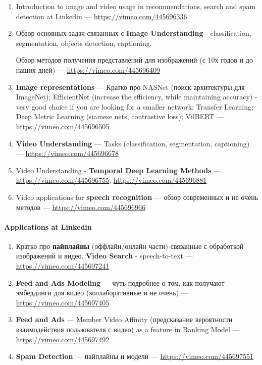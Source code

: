 \begin{enumerate}
    \item Introduction to image and video usage in recommendations, search and spam detection at Linkedin --- \url{https://vimeo.com/445696336}
    \item Обзор основных задач связанных с \textbf{Image Understanding} - classification, segmentation, objects detection, captioning.
    
        Обзор методов получения представлений для изображений (с 10х годов и до наших дней) --- \url{https://vimeo.com/445696409}
    \item \textbf{Image representations} --- Кратко про NASNet (поиск архитектуры для ImageNet); EfficientNet (increase the efficiency, while maintaining accuracy) - very good choice if you are looking for a smaller network; Transfer Learning; Deep Metric Learning (siamese nets, contrastive loss); VilBERT --- \url{https://vimeo.com/445696505}
    \item \textbf{Video Understanding} --- Tasks (classification, segmentation, captioning)  --- \url{https://vimeo.com/445696678}
    \item Video Understanding - \textbf{Temporal Deep Learning Methods} --- \url{https://vimeo.com/445696755}, \url{https://vimeo.com/445696881}
    \item Video applications for \textbf{speech recognition} --- обзор современных и не очень методов --- \url{https://vimeo.com/445696966}
\end{enumerate}

\paragraph{Applications at Linkedin}

\begin{enumerate}
    \item Кратко про \textbf{пайплайны} (оффлайн/онлайн части) связанные с обработкой изображений и видео. \textbf{Video Search} - speech-to-text --- \url{https://vimeo.com/445697241}
    \item \textbf{Feed and Ads Modeling} --- чуть подробнее о том, как получают эмбеддинги для видео (коллаборативные и не очень) --- \url{https://vimeo.com/445697405}
    \item \textbf{Feed and Ads} --- Member Video Affinity (предсказание вероятности взаимодействия пользователя с видео) as a feature in Ranking Model --- \url{https://vimeo.com/445697492}
    \item \textbf{Spam Detection} --- пайплайны и модели --- \url{https://vimeo.com/445697551}
\end{enumerate}


